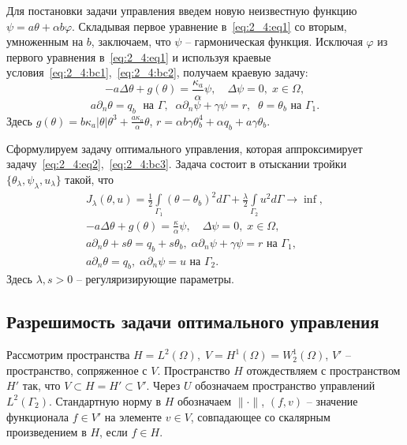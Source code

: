 Для постановки задачи управления введем новую неизвестную функцию
$\psi= a\theta + \alpha b \varphi$.
Складывая первое уравнение в~\eqref{eq:2_4:eq1} со вторым, умноженным на $b$,
заключаем, что $\psi$ -- гармоническая функция.
Исключая $\varphi$ из первого уравнения в~\eqref{eq:2_4:eq1} и используя краевые
условия~\eqref{eq:2_4:bc1},~\eqref{eq:2_4:bc2},
получаем краевую задачу:
\begin{equation}
    \label{eq:2_4:eq2}
    - a \Delta \theta + g (\theta) = \frac{\kappa_a}{\alpha}\psi, \quad
    \Delta \psi = 0, \; x \in \Omega,
\end{equation}
\begin{equation}
    \label{eq:2_4:bc3}
    a \partial_n \theta = q_b \; \text{ на }\Gamma, \;\;
    \alpha \partial_n \psi + \gamma \psi  =  r,\;\;
    \theta = \theta_b  \text{ на }\Gamma_1.
\end{equation}
Здесь $g(\theta) = b \kappa_a|\theta|\theta^3 + \frac{a\kappa_a}{\alpha}\theta$, $r=\alpha b \gamma \theta_b^4+ \alpha q_b + a \gamma \theta_b$.

Сформулируем задачу оптимального управления, которая аппроксимирует
задачу~\eqref{eq:2_4:eq2},~\eqref{eq:2_4:bc3}.
Задача состоит в отыскании тройки $\{\theta_\lambda,\psi_\lambda,u_\lambda\}$ такой, что
\begin{gather}
    \label{eq:2_4:cost}
    J_\lambda(\theta, u) =
    \frac{1}{2} \int \limits_{\Gamma_1} (\theta - \theta_b)^2 d \Gamma
    + \frac{\lambda}{2}\int\limits_{\Gamma_2} u^2 d\Gamma \rightarrow \inf, \\
    - a \Delta \theta + g (\theta) = \frac{\kappa}{\alpha}\psi, \quad
    \Delta \psi = 0, \; x \in \Omega, \\
    a \partial_n \theta + s \theta = q_b + s \theta_b,
    \; \alpha \partial_n \psi + \gamma \psi = r
    \text{ на } \Gamma_1,\\
    a \partial_n \theta = q_b, \;
    \alpha \partial_n \psi = u \text{ на } \Gamma_2.
\end{gather}
Здесь $\lambda, s > 0$ -- регуляризирующие параметры.

\subsection{Разрешимость задачи оптимального управления}
\label{subsec:ch2/sec4/solvability}
Рассмотрим пространства $H = L^2(\Omega), \; V = H^1(\Omega)=W^1_2(\Omega)$, $V'$
-- пространство, сопряженное с $V$.
Пространство $H$ отождествляем с пространством $H'$ так, что $V \subset H = H' \subset V'$.
Через $U$ обозначаем пространство управлений $L^2(\Gamma_2)$.
Стандартную норму в $H$ обозначаем $\|\cdot\|$,
$(f,v)$ -- значение функционала $f\in V'$ на элементе $v\in V$,
совпадающее со скалярным произведением в $H$, если $f\in H$.



